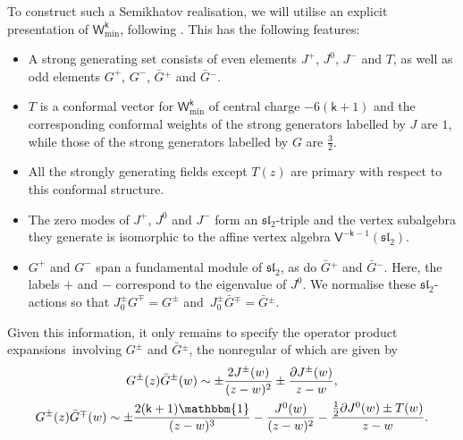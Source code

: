 \documentclass[pdftex]{sigma}
\numberwithin{equation}{section}
\newcommand{\pd}{\partial} %
\newcommand{\wun}{\mathbbm{1}} %
\newcommand{\bG}{\bar{G}{}}
\newcommand{\kk}{\mathsf{k}} %
\newcommand{\alg}[1]{\mathfrak{#1}} %
\newcommand{\VOA}[1]{\mathsf{#1}} %
\newcommand{\SLA}[2]{\alg{#1}_{#2}} %
\newcommand{\sltwo}{\SLA{sl}{2}}
\newcommand{\uaff}[2]{\VOA{V}^{#1}(#2)} %
\newcommand{\usl}[1][\kk]{\uaff{#1}{\sltwo}} %
\newcommand{\uwalg}[2]{\VOA{W}^{#1}_{\mathrm{#2}}} %
\newcommand{\umin}[1][\kk]{\uwalg{#1}{min}} %
\newcommand{\ope}{operator product expansion}
\newcommand{\opes}{\ope s}
\begin{document}
To construct such a Semikhatov realisation, we will utilise an explicit presentation of $\umin$, following \cite{KacQua03,KacQua03b}.
This has the following features:
\begin{itemize}\itemsep=0pt
	\item A strong generating set consists of even elements $J^+$, $J^0$, $J^-$ and $T$, as well as odd elements $G^+$, $G^-$, $\bG^+$ and $\bG^-$.
	\item $T$ is a conformal vector for $\umin$ of central charge $-6(\kk+1)$ and the corresponding conformal weights of the strong generators labelled by $J$ are $1$, while those of the strong generators labelled by $G$ are $\frac{3}{2}$.
	\item All the strongly generating fields except $T(z)$ are primary with respect to this conformal structure.
	\item The zero modes of $J^+$, $J^0$ and $J^-$ form an $\sltwo$-triple and the vertex subalgebra they generate is isomorphic to the affine vertex algebra $\usl[-\kk-1]$.
	\item $G^+$ and $G^-$ span a fundamental module of $\sltwo$, as do $\bG^+$ and $\bG^-$.
	Here, the labels $+$ and $-$ correspond to the eigenvalue of $J^0$.
	We normalise these $\sltwo$-actions so that $J^{\pm}_0 G^{\mp} = G^{\pm}$ and~${J^{\pm}_0 \bG^{\mp} = \bG^{\pm}}$.
\end{itemize}
Given this information, it only remains to specify the \opes\ involving $G^{\pm}$ and $\bG^{\pm}$, the nonregular of which are given by
\begin{gather*}
 G^{\pm} (z) \bG^{\pm} (w) \sim \pm \frac{2 J^{\pm} (w)}{(z-w)^2} \pm \frac{\pd J^{\pm} (w)}{z-w}, \\
 G^{\pm} (z) \bG^{\mp} (w) \sim \pm \frac{2(\kk+1) \wun}{(z-w)^3} - \frac{J^0 (w)}{(z-w)^2} - \frac{\frac{1}{2} \pd J^0(w) \pm T(w)}{z-w}.
\end{gather*}
\end{document}
